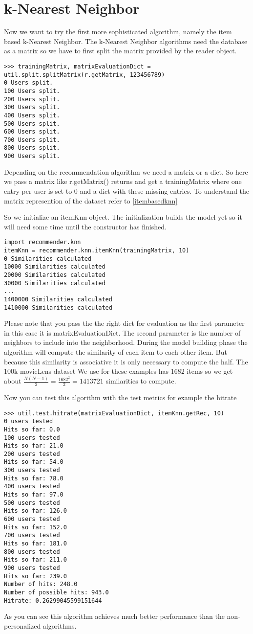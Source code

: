 \section{k-Nearest Neighbor}
Now we want to try the first more sophisticated algorithm, namely the item based
k-Nearest Neighbor. The k-Nearest Neighbor algorithms need the database as a matrix so we have to
first split the matrix provided by the reader object.
\begin{lstlisting}
>>> trainingMatrix, matrixEvaluationDict = util.split.splitMatrix(r.getMatrix, 123456789)
0 Users split.
100 Users split.
200 Users split.
300 Users split.
400 Users split.
500 Users split.
600 Users split.
700 Users split.
800 Users split.
900 Users split.
\end{lstlisting}
Depending on the recommendation algorithm we need a matrix or a dict.
So here we pass a matrix like r.getMatrix() returns and get a trainingMatrix where one
entry per user is set to 0 and a dict with these missing entries.
To understand the matrix represention of the dataset refer to \ref{itembasedknn}

So we initialize an itemKnn object. The initialization builds the model yet
so it will need some time until the constructor has finished.
\begin{lstlisting}
import recommender.knn
itemKnn = recommender.knn.itemKnn(trainingMatrix, 10)
0 Similarities calculated
10000 Similarities calculated
20000 Similarities calculated
30000 Similarities calculated
...
1400000 Similarities calculated
1410000 Similarities calculated
\end{lstlisting}
Please note that you pass the the right dict for evaluation as the first parameter
in this case it is matrixEvaluationDict.
The second parameter is the number of neighbors to include into the neighborhood.
During the model building phase the algorithm will compute the similarity of each
item to each other item. But because this similarity is associative it is only
necessary to compute the half. The 100k movieLens dataset We use for these examples
has 1682 items so we get about \begin{math} \frac{N(N-1)}{2}=\frac{1682^2}{2} = 1413721 \end{math} 
similarities to compute.

Now you can test this algorithm with the test metrics for example the hitrate
\begin{lstlisting}
>>> util.test.hitrate(matrixEvaluationDict, itemKnn.getRec, 10)
0 users tested
Hits so far: 0.0
100 users tested
Hits so far: 21.0
200 users tested
Hits so far: 54.0
300 users tested
Hits so far: 78.0
400 users tested
Hits so far: 97.0
500 users tested
Hits so far: 126.0
600 users tested
Hits so far: 152.0
700 users tested
Hits so far: 181.0
800 users tested
Hits so far: 211.0
900 users tested
Hits so far: 239.0
Number of hits: 248.0
Number of possible hits: 943.0
Hitrate: 0.26299045599151644
\end{lstlisting}
As you can see this algorithm achieves much better performance than the
non-personalized algorithms.

